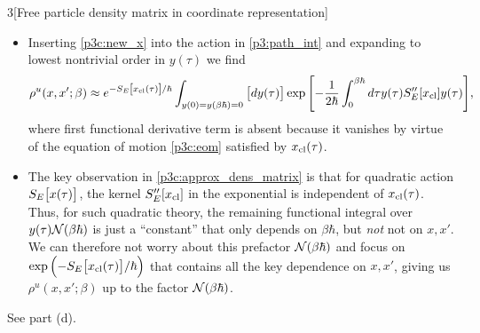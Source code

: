 \documentclass[12pt]{article}
\begin{document}
\begin{problem}{3}[Free particle density matrix in coordinate representation]
\begin{itemize}
    \item Inserting \cref{p3c:new_x} into the action in \cref{p3:path_int} and
        expanding to lowest nontrivial order in $y(\tau)$ we find
        \begin{equation}\label{p3c:approx_dens_matrix}
            \rho^u(x,x';\beta)\approx
            e^{-S_E\qty[x_{\text{cl}}(\tau)]/\hbar}
            \int_{y(0)=y(\beta\hbar)=0}\qty[dy(\tau)]
            \exp\qty[-\frac1{2\hbar}\int_0^{\beta\hbar}d\tau
            y(\tau)S_E''[x_{\text{cl}}]y(\tau)],
        \end{equation}
        where first functional derivative term is absent because it vanishes by
        virtue of the equation of motion \cref{p3c:eom} satisfied by 
        $x_{\text{cl}}(\tau)$.

    \item The key observation in \cref{p3c:approx_dens_matrix} is that for
        quadratic action $S_E\qty[x(\tau)]$, the kernel $S_E''\qty[x_{\text{cl}}]$
        in the exponential is independent of $x_{\text{cl}}(\tau)$. Thus, for such
        quadratic theory, the remaining functional integral over
        $y(\tau)\mathcal{N}(\beta\hbar)$ is just a ``constant'' that only depends on
        $\beta\hbar$, but \textit{not} not on $x,x'$. We can therefore not worry
        about this prefactor $\mathcal{N}(\beta\hbar)$ and focus on
        $\exp\qty(-S_E\qty[x_{\text{cl}}(\tau)]/\hbar)$ that contains all the key
        dependence on $x,x'$, giving us $\rho^u(x,x';\beta)$ up to the factor
        $\mathcal{N}(\beta\hbar)$.
\end{itemize}

\begin{solution}
    See part (d).
\end{solution}


\end{problem}
\end{document}

